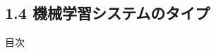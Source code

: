 \documentclass[aspectratio=169, dvipdfmx, 14pt, xcolor={svgnames,dvipsnames}]{beamer}
\def\tightlist{\itemsep1pt\parskip0pt\parsep0pt}
\begin{document}






\subsection{1.4
  機械学習システムのタイプ}\label{ux6a5fux68b0ux5b66ux7fd2ux30b7ux30b9ux30c6ux30e0ux306eux30bfux30a4ux30d7}
\begin{frame}{目次}
  \tableofcontents[currentsubsection]
\end{frame}

\end{document}
